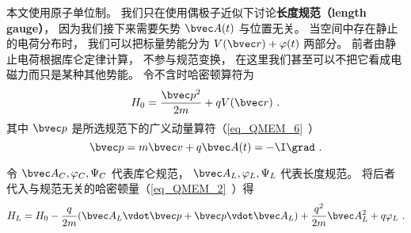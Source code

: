 

本文使用原子单位制。 我们只在使用偶极子近似下讨论\textbf{长度规范（length gauge）}， 因为我们接下来需要矢势 $\bvec A(t)$ 与位置无关。 当空间中存在静止的电荷分布时， 我们可以把标量势能分为 $V(\bvec r) + \varphi(t)$ 两部分。 前者由静止电荷根据库仑定律计算， 不参与规范变换， 在这里我们甚至可以不把它看成电磁力而只是某种其他势能。 令不含时哈密顿算符为
\begin{equation}
H_0 = \frac{\bvec p^2}{2m} + qV(\bvec r)~.
\end{equation}
其中 $\bvec p$ 是所选规范下的广义动量算符（\autoref{eq_QMEM_6}~）
\begin{equation}
\bvec p = m \bvec v + q\bvec A(t) = -\I \grad~.
\end{equation}

令 $\bvec A_C, \varphi_C, \Psi_C$ 代表库仑规范， $\bvec A_L, \varphi_L, \Psi_L$ 代表长度规范。 将后者代入与规范无关的哈密顿量（\autoref{eq_QMEM_2}~）得
\begin{equation}\label{eq_LenGau_2}
H_L = H_0 - \frac{q}{2m} (\bvec A_L \vdot \bvec p + \bvec p \vdot \bvec A_L)
+ \frac{q^2}{2m} \bvec A_L^2 + q \varphi_L~.
\end{equation}


